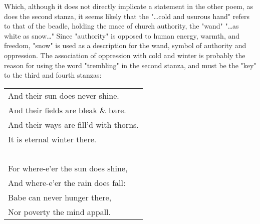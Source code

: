 Which, although it does not directly implicate a statement in the other poem, as does the second stanza, it
seems likely that the "\dots cold and usurous hand" refers to that of the beadle, holding
the mace of church authority, the "wand" "\dots as white as snow\dots" Since "authority" is opposed to human
energy, warmth, and freedom, "snow" is used as a description for the wand, symbol of authority and oppression.
The association of oppression with cold and winter is probably the reason for using the word "trembling" in the
second stanza, and must be the "key" to the third and fourth stanzas:\par
\begin{center}
	\begin{tabular}{l}
		And their sun does never shine.        \\
		And their fields are bleak \& bare.    \\
		And their ways are fill'd with thorns. \\
		It is eternal winter there.            \\
		~                                      \\
		For where-e'er the sun does shine,     \\
		And where-e'er the rain does fall:     \\
		Babe can never hunger there,           \\
		Nor poverty the mind appall.
	\end{tabular}
\end{center}

\newpage

